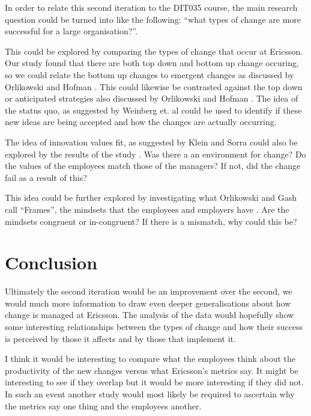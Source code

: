 \documentclass[conference]{IEEEtran}
\begin{document}
In order to relate this second iteration to the DIT035 course, the main research question could be turned into like the following: ``what types of change are more successful for a large organisation?''.

This could be explored by comparing the types of change that occur at Ericsson. Our study found that there are both top down and bottom up change occuring, so we could relate the bottom up changes to emergent changes as discussed by Orlikowski and Hofman \cite{orlikowski1997imporvisational}. This could likewise be contrasted against the top down or anticipated strategies also discussed by Orlikowski and Hofman \cite{orlikowski1997imporvisational}. The idea of the status quo, as suggested by Weinberg et. al \cite{weinberg1997quality} could be used to identify if these new ideas are being accepted and how the changes are actually occurring.

The idea of innovation values fit, as suggested by Klein and Sorra could also be explored by the results of the study \cite{klein1996challenge}. Was there a an environment for change? Do the values of the employees match those of the managers? If not, did the change fail as a result of this?

This idea could be further explored by investigating what Orlikowski and Gash call ``Frames'', the mindsets that the employees and employers have \cite{orlikowski1992changing}. Are the mindsets congruent or in-congruent? If there is a mismatch, why could this be?

\section{Conclusion}

Ultimately the second iteration would be an improvement over the second, we would much more information to draw even deeper generalisations about how change is managed at Ericsson. The analysis of the data would hopefully show some interesting relationships between the types of change and how their success is perceived by those it affects and by those that implement it.

I think it would be interesting to compare what the employees think about the productivity of the new changes versus what Ericsson's metrics say. It might be interesting to see if they overlap but it would be more interesting if they did not. In such an event another study would most likely be required to ascertain why the metrics say one thing and the employees another.

{}


\end{document}
